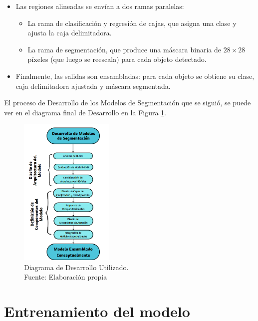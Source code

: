 \begin{enumerate}
\begin{itemize}
\begin{itemize}
    \item Las regiones alineadas se envían a dos ramas paralelas:
    \begin{itemize}
        \item La rama de clasificación y regresión de cajas, que asigna una clase y ajusta la caja delimitadora.
        \item La rama de segmentación, que produce una máscara binaria de $28 \times 28$ píxeles (que luego se reescala) para cada objeto detectado.
    \end{itemize}
    
    \item Finalmente, las salidas son ensambladas: para cada objeto se obtiene su clase, caja delimitadora ajustada y máscara segmentada.
\end{itemize}

  \end{itemize}
\end{enumerate}


El proceso de Desarrollo de los Modelos de Segmentación que se siguió, se puede ver en el diagrama final de Desarrollo en la Figura \ref{4:figdesfin}.
\begin{figure}[h]
	\begin{center}
		\includegraphics[width=0.40\textwidth]{4/figures/Diagrama de desarrollo.png}
		\caption[Diagrama de Desarrollo Utilizado]{Diagrama de Desarrollo Utilizado.\\
		Fuente: Elaboración propia}
		\label{4:figdesfin}
	\end{center}
\end{figure}
\clearpage
\newpage

\section{Entrenamiento del modelo}

